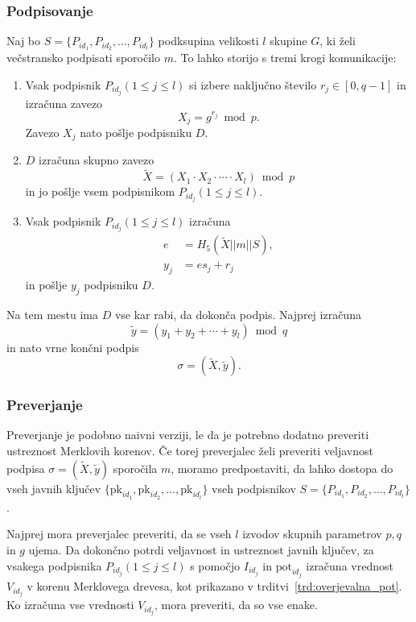 \documentclass[isrm2, tisk]{fmfdelo}
\begin{document}
\subsubsection{Podpisovanje}
Naj bo $S = \{P_{id_1}, P_{id_2}, \dots, P_{id_l}\}$ podksupina velikosti $l$ skupine $G$, ki želi 
večstransko podpisati sporočilo $m$. To lahko storijo s tremi krogi komunikacije:
\begin{enumerate}
    \item Vsak podpisnik $P_{id_j} (1 \le j \le l)$ si izbere naključno število $r_j \in [0, q - 1]$ 
        in izračuna zavezo
        $$ 
        X_j = g^{r_j} \bmod p.
        $$
        Zavezo $X_j$ nato pošlje podpisniku $D$.
    \item $D$ izračuna skupno zavezo
        $$ 
        \tilde{X} = (X_1 \cdot X_2 \cdot \cdots \cdot X_l) \bmod p
        $$
        in jo pošlje vsem podpisnikom $P_{id_j} (1 \le j \le l)$.
    \item Vsak podpisnik $P_{id_j} (1 \le j \le l)$ izračuna
        \begin{align*}
            e &= H_5(\tilde{X} || m || S), \\
            y_j &= e s_j + r_j
        \end{align*}
        in pošlje $y_j$ podpisniku $D$.
\end{enumerate}
Na tem mestu ima $D$ vse kar rabi, da dokonča podpis. Najprej izračuna
$$ 
\tilde{y} = (y_1 + y_2 + \cdots + y_l) \bmod q
$$
in nato vrne končni podpis
$$
\sigma = (\tilde{X}, \tilde{y}).
$$

\subsubsection{Preverjanje}
Preverjanje je podobno naivni verziji, le da je potrebno dodatno preveriti ustreznost Merklovih
korenov. Če torej preverjalec želi preveriti veljavnost podpisa $\sigma = (\tilde{X}, \tilde{y})$
sporočila $m$, moramo predpostaviti, da lahko dostopa do vseh javnih ključev $\{\text{pk}_{id_1},
\text{pk}_{id_2}, \dots, \text{pk}_{id_l}\}$ vseh podpisnikov $S = \{P_{id_1}, P_{id_2}, \dots, 
P_{id_l}\}$.

Najprej mora preverjalec preveriti, da se vseh $l$ izvodov skupnih parametrov $p, q$ in $g$ ujema.
Da dokončno potrdi veljavnost in ustreznost javnih ključev, za vsakega podpisnika $P_{id_j} (1 \le
j \le l)$ s pomočjo $I_{id_j}$ in $\text{pot}_{id_j}$ izračuna vrednost $V_{id_j}$ v korenu 
Merklovega drevesa, kot prikazano v trditvi~\ref{trd:overjevalna_pot}. Ko izračuna vse vrednosti
$V_{id_j}$, mora preveriti, da so vse enake. 
\end{document}
